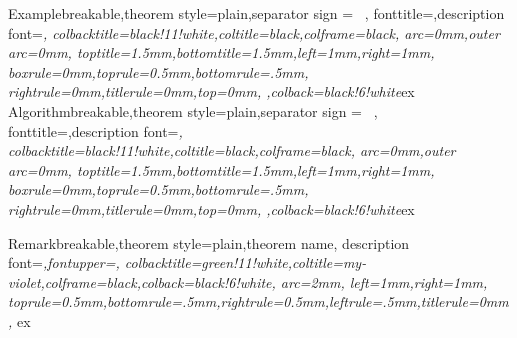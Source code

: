 %
  {Example}{breakable,theorem style=plain,separator sign = \ ,
  	fonttitle=\sffamily\normalsize,description font=\sf\itshape,
  	colbacktitle=black!11!white,coltitle=black,colframe=black,
    arc=0mm,outer arc=0mm,
    toptitle=1.5mm,bottomtitle=1.5mm,left=1mm,right=1mm,
	boxrule=0mm,toprule=0.5mm,bottomrule=.5mm,	rightrule=0mm,titlerule=0mm,top=0mm,
	,colback=black!6!white}{ex}
%
  {Algorithm}{breakable,theorem style=plain,separator sign = \ ,
  	fonttitle=\sffamily\normalsize,description font=\sf\itshape,
  	colbacktitle=black!11!white,coltitle=black,colframe=black,
    arc=0mm,outer arc=0mm,
    toptitle=1.5mm,bottomtitle=1.5mm,left=1mm,right=1mm,
	boxrule=0mm,toprule=0.5mm,bottomrule=.5mm,	rightrule=0mm,titlerule=0mm,top=0mm,
	,colback=black!6!white}{ex}

%
  {Remark}{breakable,theorem style=plain,theorem name,
  	description font=\sf\itshape,fontupper=\sffamily\normalsize, colbacktitle=green!11!white,coltitle=my-violet,colframe=black,colback=black!6!white,
    arc=2mm,
    left=1mm,right=1mm,
	toprule=0.5mm,bottomrule=.5mm,rightrule=0.5mm,leftrule=.5mm,titlerule=0mm,
	}{ex}
	
	
